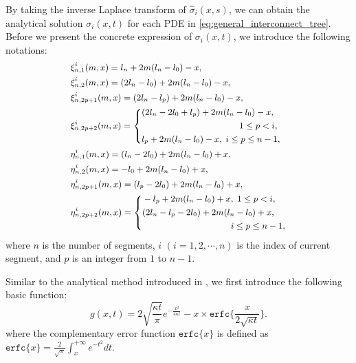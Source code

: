 By taking the inverse Laplace transform of $\hat{\sigma}_{i}(x,s)$, we
can obtain the analytical solution $\sigma_i(x,t)$ for each PDE in
\eqref{eq:general_interconnect_tree}. Before we present the concrete
expression of $\sigma_i(x,t)$, we introduce the following notations:
\begin{equation} \label{generalNotations}\small
\begin{split}
&\xi_{n,1}^{i}(m,x)=l_n+2m(l_n-l_0)-x,\\
&\xi_{n,2}^{i}(m,x)=(2l_n-l_0)+2m(l_n-l_0)-x,\\
&\xi_{n,2p+1}^{i}(m,x)=(2l_n-l_p)+2m(l_n-l_0)-x,\\
&\xi_{n,2p+2}^{i}(m,x)=\left\{
   \begin{aligned}
   &(2l_n-2l_0+l_p)+2m(l_n-l_0)-x,\;\\
   &\qquad\qquad\qquad\qquad\qquad\quad 1\leq p<i,  \\
   &l_p+2m(l_n-l_0)-x,\;i\leq p\leq n-1, \\
      \end{aligned}
   \right. \\
&\eta_{n,1}^{i}(m,x)=(l_n-2l_0)+2m(l_n-l_0)+x,\\
&\eta_{n,2}^{i}(m,x)=-l_0+2m(l_n-l_0)+x,\\
&\eta_{n,2p+1}^{i}(m,x)=(l_p-2l_0)+2m(l_n-l_0)+x,\\
&\eta_{n,2p+2}^{i}(m,x)=\left\{
   \begin{aligned}
   &-l_p+2m(l_n-l_0)+x,\;1\leq p<i,  \\
   &(2l_n-l_p-2l_0)+2m(l_n-l_0)+x,\; \\
   &\qquad\qquad\qquad\qquad\qquad i\leq p \leq n-1, \\
   \end{aligned}
   \right.
\end{split}
\end{equation}
where $n$ is the number of segments, $i$ $(i=1,2,\cdots,n)$ is the index of current segment, and $p$ is an integer from $1$ to $n-1$.

Similar to the analytical method introduced in
\cite{ChenHuang:DAC'15}, we first introduce the following basic
function:
\begin{equation} \label{general_basisFunc}
g(x,t)=2\sqrt{\frac{\kappa t}{\pi}}e^{-\frac{x^2}{4\kappa
t}}-x\times\texttt{erfc}\{\frac{x}{2\sqrt{\kappa t}}\}.
\end{equation}
where the complementary error function $\texttt{erfc}\{x\}$ is defined
as
$\texttt{erfc}\{x\}=\frac{2}{\sqrt{\pi}}\int_x^{+\infty}e^{-t^2}dt$.

